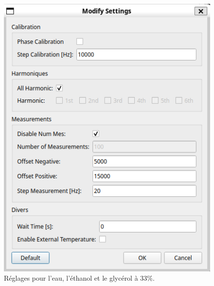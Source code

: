 \begin{figure}[H]
    \centering
    \begin{minipage}{0.48\textwidth}
        \centering
        \includegraphics[width=\textwidth]{assets/figures/SettingsWater-Ethanol.png}
        \caption{Réglages pour l'eau, l'éthanol et le glycérol à 33\%.}
    \end{minipage}\hfill
    \begin{minipage}{0.48\textwidth}
        \centering

\end{minipage}
\end{figure}
